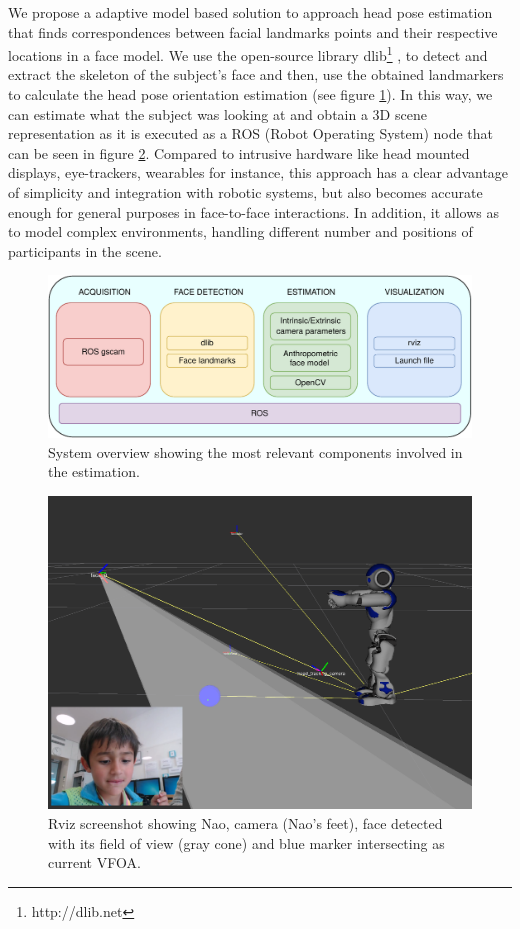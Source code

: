\documentclass{sig-alternate}
\begin{document}
We propose a adaptive model based solution to approach head pose estimation that finds correspondences between facial landmarks points and their respective locations in a face model. We use the open-source library dlib\footnote{http://dlib.net} \cite{dlib09}, to detect and extract the skeleton of the subject's face and then, use the obtained landmarkers to calculate the head pose orientation estimation (see figure \ref{system}). In this way, we can estimate what the subject was looking at and obtain a 3D scene representation as it is executed as a ROS (Robot Operating System) node that can be seen in figure \ref{rviz}. Compared to intrusive hardware like head mounted displays, eye-trackers, wearables for instance, this approach has a clear advantage of simplicity and integration with robotic systems, but also becomes accurate enough for general purposes in face-to-face interactions. In addition, it allows as to model complex environments, handling different number and positions of participants in the scene.

\begin{figure}[h!]
    \centering
    \includegraphics[width=0.9\columnwidth]{system}
    \caption{\small System overview showing the most relevant components involved in the estimation.}
    \label{system}
\end{figure}


\begin{figure}
    \centering
    \includegraphics[width=0.9\columnwidth]{rviz_camera}
    \caption{\small Rviz screenshot showing Nao, camera (Nao's feet), face detected with its field of view (gray cone) and blue marker intersecting as current VFOA.}
    \label{rviz}
\end{figure}
\end{document}
